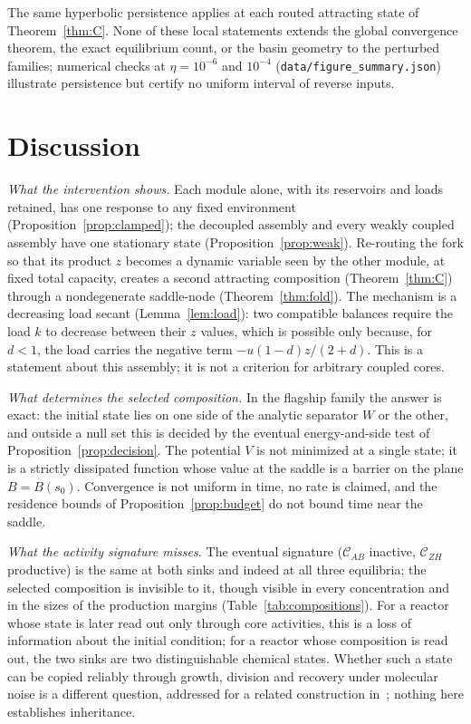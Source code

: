 \documentclass[11pt,a4paper]{article}
\theoremstyle{plain}
\theoremstyle{definition}
\theoremstyle{remark}
\newcommand{\cAB}{\mathcal{C}_{AB}}
\newcommand{\cZH}{\mathcal{C}_{ZH}}
\begin{document}
The same hyperbolic persistence applies at each routed attracting state of Theorem~\ref{thm:C}. None of these local statements extends the global convergence theorem, the exact equilibrium count, or the basin geometry to the perturbed families; numerical checks at $\eta=10^{-6}$ and $10^{-4}$ (\texttt{data/figure\_summary.json}) illustrate persistence but certify no uniform interval of reverse inputs.

\section{Discussion}\label{sec:discussion}

\emph{What the intervention shows.} Each module alone, with its reservoirs and loads retained, has one response to any fixed environment (Proposition~\ref{prop:clamped}); the decoupled assembly and every weakly coupled assembly have one stationary state (Proposition~\ref{prop:weak}). Re-routing the fork so that its product $z$ becomes a dynamic variable seen by the other module, at fixed total capacity, creates a second attracting composition (Theorem~\ref{thm:C}) through a nondegenerate saddle-node (Theorem~\ref{thm:fold}). The mechanism is a decreasing load secant (Lemma~\ref{lem:load}): two compatible balances require the load $k$ to decrease between their $z$ values, which is possible only because, for $d<1$, the load carries the negative term $-u(1-d)z/(2+d)$. This is a statement about this assembly; it is not a criterion for arbitrary coupled cores.

\emph{What determines the selected composition.} In the flagship family the answer is exact: the initial state lies on one side of the analytic separator $W$ or the other, and outside a null set this is decided by the eventual energy-and-side test of Proposition~\ref{prop:decision}. The potential $V$ is not minimized at a single state; it is a strictly dissipated function whose value at the saddle is a barrier on the plane $B=B(s_0)$. Convergence is not uniform in time, no rate is claimed, and the residence bounds of Proposition~\ref{prop:budget} do not bound time near the saddle.

\emph{What the activity signature misses.} The eventual signature ($\cAB$ inactive, $\cZH$ productive) is the same at both sinks and indeed at all three equilibria; the selected composition is invisible to it, though visible in every concentration and in the sizes of the production margins (Table~\ref{tab:compositions}). For a reactor whose state is later read out only through core activities, this is a loss of information about the initial condition; for a reactor whose composition is read out, the two sinks are two distinguishable chemical states. Whether such a state can be copied reliably through growth, division and recovery under molecular noise is a different question, addressed for a related construction in~\cite{copying2026}; nothing here establishes inheritance.
\end{document}
